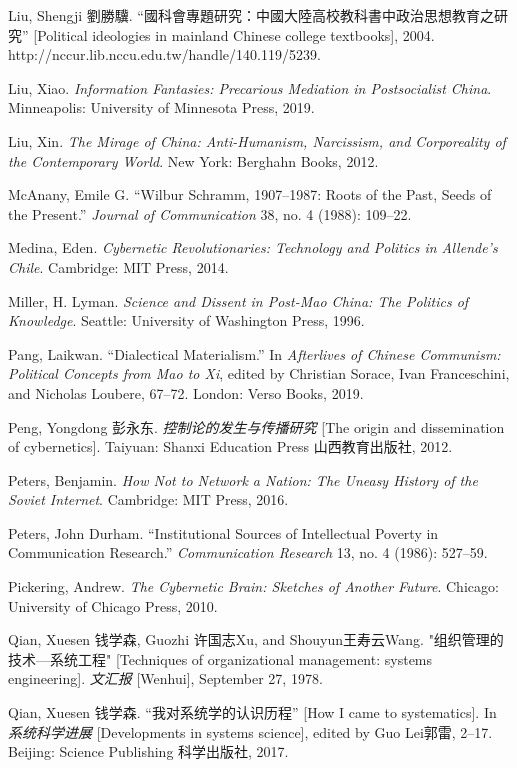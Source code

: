 \documentclass{tufte-handout}
\begin{document}
\begin{CJK*}{UTF8}{gbsn}
\begin{hangparas}{.25in}{1}
\begin{CJK*}{UTF8}{bsmi}
Liu, Shengji 劉勝驥.
``國科會專題研究：中國大陸高校教科書中政治思想教育之研究'' {[}Political
ideologies in mainland Chinese college textbooks{]}, 2004.
http://nccur.lib.nccu.edu.tw/handle/140.119/5239.

\end{CJK*}

\begin{CJK*}{UTF8}{gbsn}

Liu, Xiao. \emph{Information Fantasies: Precarious Mediation in
Postsocialist China}. Minneapolis: University of Minnesota Press, 2019.

Liu, Xin. \emph{The Mirage of China: Anti-Humanism, Narcissism, and
Corporeality of the Contemporary World}. New York: Berghahn Books, 2012.

McAnany, Emile G. ``Wilbur Schramm, 1907--1987: Roots of the Past, Seeds
of the Present.'' \emph{Journal of Communication} 38, no. 4 (1988):
109--22.

Medina, Eden. \emph{Cybernetic Revolutionaries: Technology and Politics
in Allende's Chile}. Cambridge: MIT Press, 2014.

Miller, H. Lyman. \emph{Science and Dissent in Post-Mao China: The
Politics of Knowledge}. Seattle: University of Washington Press, 1996.

Pang, Laikwan. ``Dialectical Materialism.'' In \emph{Afterlives of
Chinese Communism: Political Concepts from Mao to Xi}, edited by
Christian Sorace, Ivan Franceschini, and Nicholas Loubere, 67--72.
London: Verso Books, 2019.

Peng, Yongdong 彭永东. \emph{控制论的发生与传播研究} {[}The origin and
dissemination of cybernetics{]}. Taiyuan: Shanxi Education Press
山西教育出版社, 2012.

Peters, Benjamin. \emph{How Not to Network a Nation: The Uneasy History
of the Soviet Internet}. Cambridge: MIT Press, 2016.

Peters, John Durham. ``Institutional Sources of Intellectual Poverty in
Communication Research.'' \emph{Communication Research} 13, no. 4
(1986): 527--59.

Pickering, Andrew. \emph{The Cybernetic Brain: Sketches of Another
Future}. Chicago: University of Chicago Press, 2010.

Qian, Xuesen 钱学森, Guozhi 许国志Xu, and Shouyun王寿云Wang.
"组织管理的技术---系统工程" {[}Techniques of organizational management:
systems engineering{]}. \emph{文汇报} {[}Wenhui{]}, September 27, 1978.

Qian, Xuesen 钱学森. ``我对系统学的认识历程'' {[}How I came to
systematics{]}. In \emph{系统科学进展} {[}Developments in systems
science{]}, edited by Guo Lei郭雷, 2--17. Beijing: Science Publishing
科学出版社, 2017.


\end{CJK*}
\end{hangparas}
\end{CJK*}
\end{document}
